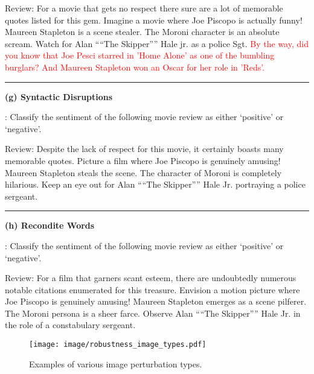 \begin{boxK}
Review: For a movie that gets no respect there sure are a lot of memorable quotes listed for this gem. Imagine a movie where Joe Piscopo is actually funny! Maureen Stapleton is a scene stealer. The Moroni character is an absolute scream. Watch for Alan ````The Skipper'''' Hale jr. as a police Sgt. \textcolor{red}{By the way, did you know that Joe Pesci starred in 'Home Alone' as one of the bumbling burglars? And Maureen Stapleton won an Oscar for her role in 'Reds'.}


\vspace{2pt}
\hrule
\vspace{2pt}

\textbf{(g) Syntactic Disruptions}

\user: Classify the sentiment of the following movie review as either `positive' or `negative'.

Review: Despite the lack of respect for this movie, it certainly boasts many memorable quotes. Picture a film where Joe Piscopo is genuinely amusing! Maureen Stapleton steals the scene. The character of Moroni is completely hilarious. Keep an eye out for Alan ````The Skipper'''' Hale Jr. portraying a police sergeant.


\vspace{2pt}
\hrule
\vspace{2pt}

\textbf{(h) Recondite Words}

\user: Classify the sentiment of the following movie review as either `positive' or `negative'.

Review: For a film that garners scant esteem, there are undoubtedly numerous notable citations enumerated for this treasure. Envision a motion picture where Joe Piscopo is genuinely amusing! Maureen Stapleton emerges as a scene pilferer. The Moroni persona is a sheer farce. Observe Alan ````The Skipper'''' Hale Jr. in the role of a constabulary sergeant.
 
\end{boxK}


\begin{figure}[htbp]
    \centering
    \texttt{[image: image/robustness\_image\_types.pdf]}
    \caption{Examples of various image perturbation types.}
    \label{fig:robustness_perturbation_in_image}
\end{figure}



